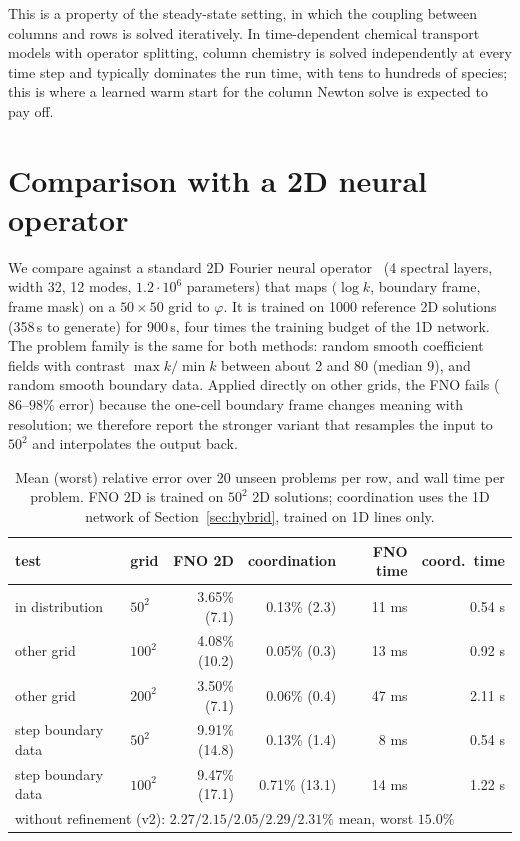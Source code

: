 \documentclass[11pt]{article}
\begin{document}
This is a property of the steady-state setting, in which the coupling between columns and rows is solved
iteratively. In time-dependent chemical transport models with operator splitting, column chemistry is solved
independently at every time step and typically dominates the run time, with tens to hundreds of species; this
is where a learned warm start for the column Newton solve is expected to pay off.

\section{Comparison with a 2D neural operator}
\label{sec:baseline}
We compare against a standard 2D Fourier neural operator~\cite{li2021fno} (4 spectral layers, width 32,
12 modes, $1.2\cdot10^6$ parameters) that maps $(\log k$, boundary frame, frame mask$)$ on a $50\times50$ grid
to $\varphi$. It is trained on 1000 reference 2D solutions (358\,s to generate) for 900\,s, four times the
training budget of the 1D network. The problem family is the same for both methods: random smooth
coefficient fields with contrast $\max k/\min k$ between about 2 and 80 (median 9), and random smooth
boundary data. Applied directly on other grids, the FNO fails ($86$--$98\%$ error) because the one-cell
boundary frame changes meaning with resolution; we therefore report the stronger variant that resamples the
input to $50^2$ and interpolates the output back.

\begin{table}[t]
\centering
\caption{Mean (worst) relative error over 20 unseen problems per row, and wall time per problem.
FNO 2D is trained on $50^2$ 2D solutions; coordination uses the 1D network of Section~\ref{sec:hybrid},
trained on 1D lines only.}
\label{tab:baseline}
\begin{tabular}{llrrrr}
\toprule
test & grid & FNO 2D & coordination & FNO time & coord.\ time\\
\midrule
in distribution & $50^2$ & 3.65\% (7.1) & 0.13\% (2.3) & 11 ms & 0.54 s\\
other grid & $100^2$ & 4.08\% (10.2) & 0.05\% (0.3) & 13 ms & 0.92 s\\
other grid & $200^2$ & 3.50\% (7.1) & 0.06\% (0.4) & 47 ms & 2.11 s\\
step boundary data & $50^2$ & 9.91\% (14.8) & 0.13\% (1.4) & 8 ms & 0.54 s\\
step boundary data & $100^2$ & 9.47\% (17.1) & 0.71\% (13.1) & 14 ms & 1.22 s\\
\midrule
\multicolumn{6}{l}{without refinement (v2): $2.27/2.15/2.05/2.29/2.31\%$ mean, worst $15.0\%$}\\
\bottomrule
\end{tabular}
\end{table}
\end{document}
